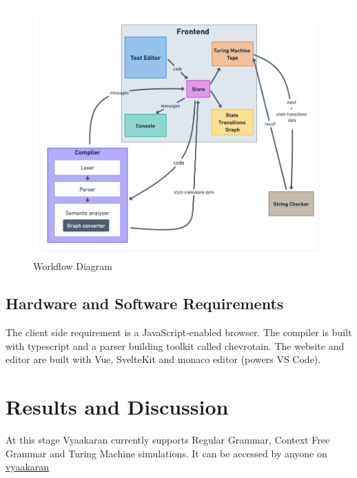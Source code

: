 \documentclass[12pt]{report}
\begin{document}
\begin{figure}[h!]
  \includegraphics[width =\columnwidth ]{workflow.png}
  \caption{Workflow Diagram}
\end{figure}

\section{Hardware and Software Requirements}
The client side requirement is a JavaScript-enabled browser. The compiler is built with typescript and a parser building toolkit called chevrotain. The website and editor are built with Vue, SvelteKit and monaco editor (powers VS Code).


\chapter{Results and Discussion}
At this stage Vyaakaran currently supports Regular Grammar, Context Free Grammar and Turing Machine simulations. It can be accessed by anyone on \href{https://vyaakaran.vercel.app/}{vyaakaran}\\
\end{document}
